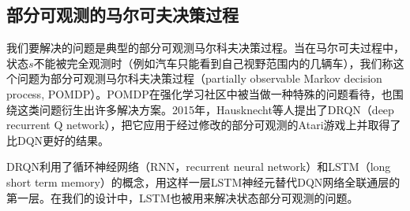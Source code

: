 \documentclass[degree=bachelor, tocarialchapter, pifootnote]{thuthesis}
\begin{document}
  \subsection{部分可观测的马尔可夫决策过程}
    我们要解决的问题是典型的部分可观测马尔科夫决策过程。当在马尔可夫过程中，状态$s$不能被完全观测时（例如汽车只能看到自己视野范围内的几辆车），我们称这个问题为部分可观测马尔科夫决策过程（partially observable Markov decision process, POMDP）。POMDP在强化学习社区中被当做一种特殊的问题看待，也围绕这类问题衍生出许多解决方案。2015年，Hausknecht等人提出了DRQN\cite{DRQ}（deep recurrent Q network），把它应用于经过修改的部分可观测的Atari游戏上并取得了比DQN更好的结果。\par
    DRQN利用了循环神经网络（RNN，recurrent neural network）和LSTM\cite{LSTM}（long short term memory）的概念，用这样一层LSTM神经元替代DQN网络全联通层的第一层。在我们的设计中，LSTM也被用来解决状态部分可观测的问题。
  
\end{document}

